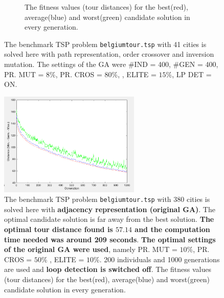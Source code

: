 \begin{figure}[!]
\begin{subfigure}{.5\textwidth}
  \caption{The fitness values (tour distances) for the best(red), average(blue) and worst(green) candidate solution in every generation. \\}
  \label{fig:belgium_tour_4_gen}
\end{subfigure}
\caption{The benchmark TSP problem \texttt{belgiumtour.tsp} with 41 cities is solved here with path representation, order crossover and inversion mutation. The settings of the GA were \#IND = 400, \#GEN = 400, PR. MUT = $8\%$, PR. CROS = $80\%$, , ELITE = $15\%$, LP DET = ON.}
\label{fig:belgium_tour_4}
\end{figure}


\begin{figure}[!]
  \centering
    \includegraphics[width=0.6\textwidth]{../figures/figures_question_4/adj_vraag4_off_gen}
      \caption{The benchmark TSP problem \texttt{belgiumtour.tsp} with 380 cities is solved here with \textbf{adjacency representation (original GA)}. The optimal candidate solution is far away from the best solution. \textbf{The optimal tour distance found is $\mathbf{57.14}$ and the computation time needed was around 209 seconds}. \textbf{The optimal settings of the original GA were used}, namely PR. MUT = $10\%$, PR. CROS = $50\%$ , ELITE = $10\%$. 200 individuals and 1000 generations are used and \textbf{loop detection is switched off}. The fitness values (tour distances) for the best(red), average(blue) and worst(green) candidate solution in every generation.}
      \label{fig:adj_vraag4_off_gen}
\end{figure}

